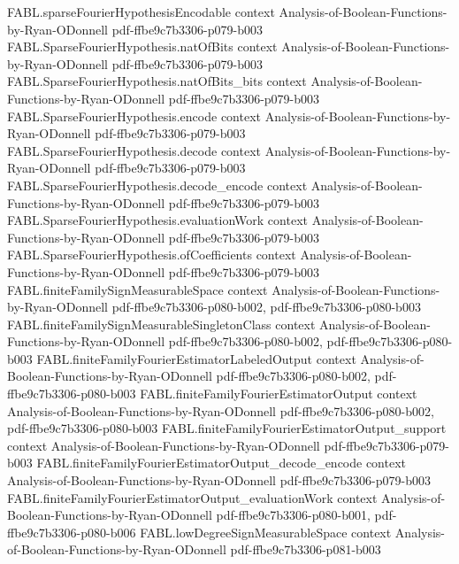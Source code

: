 \begin{theorem}
\proofstep
  {FABL.sparseFourierHypothesisEncodable}
  {context}
  {Analysis-of-Boolean-Functions-by-Ryan-ODonnell}
  {pdf-ffbe9c7b3306-p079-b003}
\proofstep
  {FABL.SparseFourierHypothesis.natOfBits}
  {context}
  {Analysis-of-Boolean-Functions-by-Ryan-ODonnell}
  {pdf-ffbe9c7b3306-p079-b003}
\proofstep
  {FABL.SparseFourierHypothesis.natOfBits_bits}
  {context}
  {Analysis-of-Boolean-Functions-by-Ryan-ODonnell}
  {pdf-ffbe9c7b3306-p079-b003}
\proofstep
  {FABL.SparseFourierHypothesis.encode}
  {context}
  {Analysis-of-Boolean-Functions-by-Ryan-ODonnell}
  {pdf-ffbe9c7b3306-p079-b003}
\proofstep
  {FABL.SparseFourierHypothesis.decode}
  {context}
  {Analysis-of-Boolean-Functions-by-Ryan-ODonnell}
  {pdf-ffbe9c7b3306-p079-b003}
\proofstep
  {FABL.SparseFourierHypothesis.decode_encode}
  {context}
  {Analysis-of-Boolean-Functions-by-Ryan-ODonnell}
  {pdf-ffbe9c7b3306-p079-b003}
\proofstep
  {FABL.SparseFourierHypothesis.evaluationWork}
  {context}
  {Analysis-of-Boolean-Functions-by-Ryan-ODonnell}
  {pdf-ffbe9c7b3306-p079-b003}
\proofstep
  {FABL.SparseFourierHypothesis.ofCoefficients}
  {context}
  {Analysis-of-Boolean-Functions-by-Ryan-ODonnell}
  {pdf-ffbe9c7b3306-p079-b003}
\proofstep
  {FABL.finiteFamilySignMeasurableSpace}
  {context}
  {Analysis-of-Boolean-Functions-by-Ryan-ODonnell}
  {pdf-ffbe9c7b3306-p080-b002,
    pdf-ffbe9c7b3306-p080-b003}
\proofstep
  {FABL.finiteFamilySignMeasurableSingletonClass}
  {context}
  {Analysis-of-Boolean-Functions-by-Ryan-ODonnell}
  {pdf-ffbe9c7b3306-p080-b002,
    pdf-ffbe9c7b3306-p080-b003}
\proofstep
  {FABL.finiteFamilyFourierEstimatorLabeledOutput}
  {context}
  {Analysis-of-Boolean-Functions-by-Ryan-ODonnell}
  {pdf-ffbe9c7b3306-p080-b002,
    pdf-ffbe9c7b3306-p080-b003}
\proofstep
  {FABL.finiteFamilyFourierEstimatorOutput}
  {context}
  {Analysis-of-Boolean-Functions-by-Ryan-ODonnell}
  {pdf-ffbe9c7b3306-p080-b002,
    pdf-ffbe9c7b3306-p080-b003}
\proofstep
  {FABL.finiteFamilyFourierEstimatorOutput_support}
  {context}
  {Analysis-of-Boolean-Functions-by-Ryan-ODonnell}
  {pdf-ffbe9c7b3306-p079-b003}
\proofstep
  {FABL.finiteFamilyFourierEstimatorOutput_decode_encode}
  {context}
  {Analysis-of-Boolean-Functions-by-Ryan-ODonnell}
  {pdf-ffbe9c7b3306-p079-b003}
\proofstep
  {FABL.finiteFamilyFourierEstimatorOutput_evaluationWork}
  {context}
  {Analysis-of-Boolean-Functions-by-Ryan-ODonnell}
  {pdf-ffbe9c7b3306-p080-b001,
    pdf-ffbe9c7b3306-p080-b006}
\proofstep
  {FABL.lowDegreeSignMeasurableSpace}
  {context}
  {Analysis-of-Boolean-Functions-by-Ryan-ODonnell}
  {pdf-ffbe9c7b3306-p081-b003}
\proofstep

\end{theorem}
